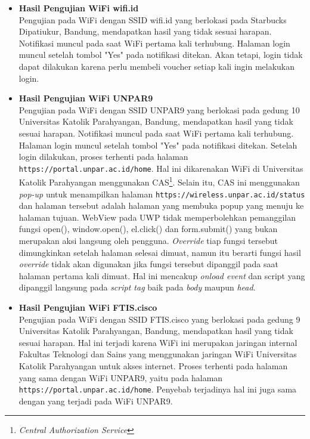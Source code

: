 \documentclass[a4paper,twoside]{article}
\begin{document}
\begin{enumerate}
\begin{itemize}
{\begin{itemize}
{\begin{itemize}
{                            }
                            \item{
                                {\bf Hasil Pengujian WiFi wifi.id}\\
                                Pengujian pada WiFi dengan SSID wifi.id yang berlokasi pada Starbucks Dipatiukur, Bandung, mendapatkan hasil yang tidak sesuai harapan. Notifikasi muncul pada saat WiFi pertama kali terhubung. Halaman login muncul setelah tombol "Yes" pada notifikasi ditekan. Akan tetapi, login tidak dapat dilakukan karena perlu membeli voucher setiap kali ingin melakukan login.
                            }
                            \item{
                                {\bf Hasil Pengujian WiFi UNPAR9}\\
                                Pengujian pada WiFi dengan SSID UNPAR9 yang berlokasi pada gedung 10 Universitas Katolik Parahyangan, Bandung, mendapatkan hasil yang tidak sesuai harapan. Notifikasi muncul pada saat WiFi pertama kali terhubung. Halaman login muncul setelah tombol "Yes" pada notifikasi ditekan. Setelah login dilakukan, proses terhenti pada halaman \texttt{https://portal.unpar.ac.id/home}. Hal ini dikarenakan WiFi di Universitas Katolik Parahyangan menggunakan CAS\footnote{\textit{Central Authorization Service}}. Selain itu, CAS ini menggunakan \textit{pop-up} untuk menampilkan halaman \texttt{https://wireless.unpar.ac.id/status} dan halaman tersebut adalah halaman yang membuka popup yang menuju ke halaman tujuan. WebView pada UWP tidak memperbolehkan pemanggilan fungsi open(), window.open(), el.click() dan form.submit() yang bukan merupakan aksi langsung oleh pengguna. \textit{Override} tiap fungsi tersebut dimungkinkan setelah halaman selesai dimuat, namun itu berarti fungsi hasil \textit{override} tidak akan digunakan jika fungsi tersebut dipanggil pada saat halaman pertama kali dimuat. Hal ini mencakup \textit{onload event} dan script yang dipanggil langsung pada \textit{script tag} baik pada \textit{body} maupun \textit{head}.
                            }
                            \item{
                                {\bf Hasil Pengujian WiFi FTIS.cisco}\\
                                Pengujian pada WiFi dengan SSID FTIS.cisco yang berlokasi pada gedung 9 Universitas Katolik Parahyangan, Bandung, mendapatkan hasil yang tidak sesuai harapan. Hal ini terjadi karena WiFi ini merupakan jaringan internal Fakultas Teknologi dan Sains yang menggunakan jaringan WiFi Universitas Katolik Parahyangan untuk akses internet. Proses terhenti pada halaman yang sama dengan WiFi UNPAR9, yaitu pada halaman \texttt{https://portal.unpar.ac.id/home}. Penyebab terjadinya hal ini juga sama dengan yang terjadi pada WiFi UNPAR9.
                            }
                        \end{itemize}
                    }
                \end{itemize}
            }
        \end{itemize}
        

\end{enumerate}
\end{document}
